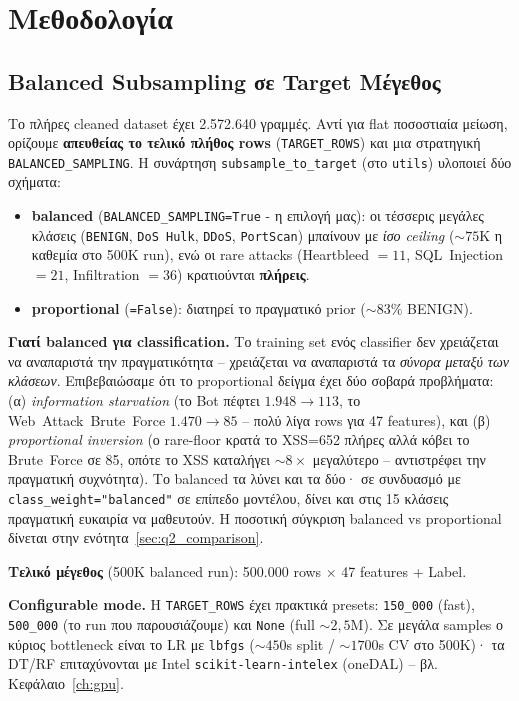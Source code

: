 \documentclass[12pt,a4paper,twoside]{book}
\begin{document}
\section{Μεθοδολογία}\label{sec:q2_methodology}

\subsection{Balanced Subsampling σε Target Μέγεθος}

Το πλήρες cleaned dataset έχει 2.572.640 γραμμές. Αντί για flat
ποσοστιαία μείωση, ορίζουμε \textbf{απευθείας το τελικό πλήθος rows}
(\texttt{TARGET\_ROWS}) και μια στρατηγική \texttt{BALANCED\_SAMPLING}.
Η συνάρτηση \texttt{subsample\_to\_target} (στο \texttt{utils}) υλοποιεί
δύο σχήματα:

\begin{itemize}
    \item \textbf{balanced} (\texttt{BALANCED\_SAMPLING=True} - η επιλογή
    μας): οι τέσσερις μεγάλες κλάσεις (\texttt{BENIGN}, \texttt{DoS~Hulk},
    \texttt{DDoS}, \texttt{PortScan}) μπαίνουν με \emph{ίσο ceiling}
    (\(\sim 75\)K η καθεμία στο 500K run), ενώ οι rare attacks
    (Heartbleed \(=11\), SQL~Injection \(=21\), Infiltration \(=36\))
    κρατιούνται \textbf{πλήρεις}.
    \item \textbf{proportional} (\texttt{=False}): διατηρεί το πραγματικό
    prior (\(\sim 83\%\) BENIGN).
\end{itemize}

\textbf{Γιατί balanced για classification.} Το training set ενός
classifier δεν χρειάζεται να αναπαριστά την πραγματικότητα -- χρειάζεται
να αναπαριστά τα \emph{σύνορα μεταξύ των κλάσεων}. Επιβεβαιώσαμε ότι το
proportional δείγμα έχει δύο σοβαρά προβλήματα: (α) \emph{information
starvation} (το Bot πέφτει \(1.948 \to 113\), το Web~Attack~Brute~Force
\(1.470 \to 85\) -- πολύ λίγα rows για 47 features), και (β)
\emph{proportional inversion} (ο rare-floor κρατά το XSS=652 πλήρες αλλά
κόβει το Brute~Force σε 85, οπότε το XSS καταλήγει \(\sim 8\times\)
μεγαλύτερο -- αντιστρέφει την πραγματική συχνότητα). Το balanced τα λύνει
και τα δύο· σε συνδυασμό με \texttt{class\_weight="balanced"} σε επίπεδο
μοντέλου, δίνει και στις 15 κλάσεις πραγματική ευκαιρία να μαθευτούν.
Η ποσοτική σύγκριση balanced vs proportional δίνεται στην
ενότητα~\ref{sec:q2_comparison}.

\textbf{Τελικό μέγεθος} (500K balanced run): 500.000 rows
\(\times\) 47 features + Label.

\textbf{Configurable mode.} Η \texttt{TARGET\_ROWS} έχει πρακτικά
presets: \texttt{150\_000} (fast), \texttt{500\_000} (το run που
παρουσιάζουμε) και \texttt{None} (full \(\sim 2{,}5\)M). Σε μεγάλα
samples ο κύριος bottleneck είναι το LR με \texttt{lbfgs}
(\(\sim 450\)s split / \(\sim 1700\)s CV στο 500K)· τα DT/RF
επιταχύνονται με Intel \texttt{scikit-learn-intelex} (oneDAL) --
βλ. Κεφάλαιο~\ref{ch:gpu}.
\end{document}
